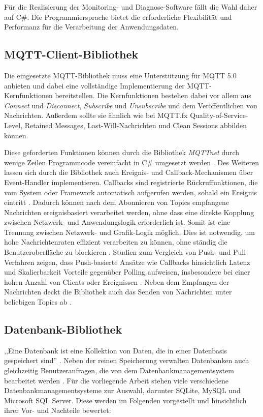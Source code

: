         Für die Realisierung der Monitoring- und Diagnose-Software fällt die Wahl daher auf C\#. Die Programmiersprache bietet die erforderliche Flexibilität und Performanz für die Verarbeitung der Anwendungsdaten.

    \subsection{MQTT-Client-Bibliothek}
        Die eingesetzte MQTT-Bibliothek muss eine Unterstützung für MQTT 5.0 anbieten und dabei eine vollständige Implementierung der MQTT-Kernfunktionen 
        bereitstellen.
        Die Kernfunktionen bestehen dabei vor allem aus \textit{Connect} und \textit{Disconnect}, \textit{Subscribe} und \textit{Unsubscribe} und dem Veröffentlichen
        von Nachrichten. Außerdem sollte sie ähnlich wie bei MQTT.fx Quality-of-Service-Level, Retained Messages, Last-Will-Nachrichten und Clean Sessions abbilden können. 
        
        Diese geforderten Funktionen können durch die Bibliothek \textit{MQTTnet} durch wenige Zeilen Programmcode vereinfacht in C\# umgesetzt werden \autocite[]{teamHowUseMQTT}. 
        Des Weiteren lassen sich durch die Bibliothek auch Ereignis- und Callback-Mechanismen über Event-Handler implementieren. Callbacks sind registrierte Rückruffunktionen, die vom System oder
        Framework automatisch aufgerufen werden, sobald ein Ereignis eintritt \autocite[23]{callback}. Dadurch können nach dem Abonnieren von Topics empfangene Nachrichten ereignisbasiert 
        verarbeitet werden, ohne dass eine direkte Kopplung zwischen Netzwerk- und Anwendungslogik erforderlich ist.
         Somit ist eine Trennung zwischen Netzwerk- und Grafik-Logik möglich. Dies ist notwendig, um hohe Nachrichtenraten 
        effizient verarbeiten zu können, ohne ständig die Benutzeroberfläche zu blockieren \autocite[113]{embeddedtechnologies}.
        Studien zum Vergleich von Push- und Pull-Verfahren zeigen, dass Push-basierte Ansätze wie Callbacks hinsichtlich Latenz und Skalierbarkeit Vorteile gegenüber Polling aufweisen, insbesondere bei einer hohen Anzahl von Clients oder Ereignissen \autocite{vyvereComparingPollingPushbased2020}. 
        Neben dem Empfangen der Nachrichten deckt die Bibliothek auch das Senden von Nachrichten unter beliebigen Topics ab \autocite{teamHowUseMQTT}. 
        
    \subsection{Datenbank-Bibliothek}
    ,,Eine Datenbank ist eine Kollektion von Daten, die in einer Datenbasis gespeichert sind'' \autocite[50]{SchubertDatenbanken}. Neben der reinen Speicherung verwalten Datenbanken auch gleichzeitig Benutzeranfragen, die von dem Datenbankmanagementsystem bearbeitet werden \autocite[50]{SchubertDatenbanken}.
    Für die vorliegende Arbeit stehen viele verschiedene Datenbankmanagementsysteme zur Auswahl, darunter SQLite, MySQL und Microsoft SQL Server. Diese werden im Folgenden vorgestellt und hinsichtlich ihrer Vor- und Nachteile bewertet:
    
